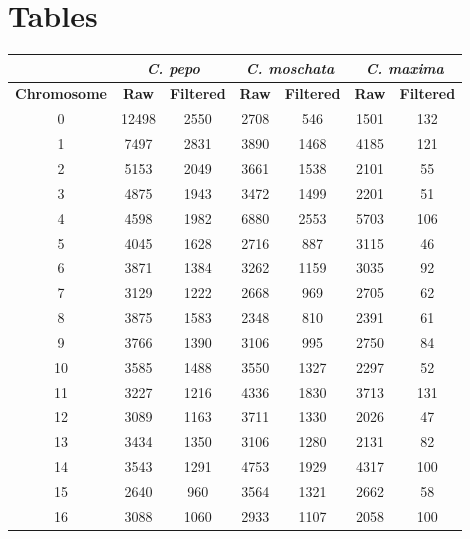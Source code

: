 \documentclass[utf8]{FrontiersinHarvard} %
\begin{document}
\clearpage

\section*{Tables}

\begin{table}[h]
	\begin{center}
\begin{tabular}{c c c c c c c}
	\hline
	& \multicolumn{2}{c}{\textbf{\textit{C. pepo}}} & \multicolumn{2}{c}{\textbf{\textit{C. moschata}}}& \multicolumn{2}{c}{\textbf{\textit{C. maxima}}} \\
	\hline
	\textbf{Chromosome} & \textbf{Raw} & \textbf{Filtered} & \textbf{Raw} & \textbf{Filtered} & \textbf{Raw} & \textbf{Filtered} \\
	\hline
	0 & 12498 & 2550 & 2708 & 546 & 1501 & 132 \\
	1 & 7497 & 2831 & 3890 & 1468 & 4185 & 121 \\
	2 & 5153 & 2049 & 3661 & 1538 & 2101 & 55 \\
	3 & 4875 & 1943 & 3472 & 1499 & 2201 & 51 \\
	4 & 4598 & 1982 & 6880 & 2553 & 5703 & 106 \\
	5 & 4045 & 1628 & 2716 & 887 & 3115 & 46 \\
	6 & 3871 & 1384 & 3262 & 1159 & 3035 & 92 \\
	7 & 3129 & 1222 & 2668 & 969 & 2705 & 62 \\
	8 & 3875 & 1583 & 2348 & 810 & 2391 & 61 \\
	9 & 3766 & 1390 & 3106 & 995 & 2750 & 84 \\
	10 & 3585 & 1488 & 3550 & 1327 & 2297 & 52 \\
	11 & 3227 & 1216 & 4336 & 1830 & 3713 & 131 \\
	12 & 3089 & 1163 & 3711 & 1330 & 2026 & 47 \\
	13 & 3434 & 1350 & 3106 & 1280 & 2131 & 82 \\
	14 & 3543 & 1291 & 4753 & 1929 & 4317 & 100 \\
	15 & 2640 & 960 & 3564 & 1321 & 2662 & 58 \\
	16 & 3088 & 1060 & 2933 & 1107 & 2058 & 100 \\

\end{tabular}
\end{center}
\end{table}
\end{document}
